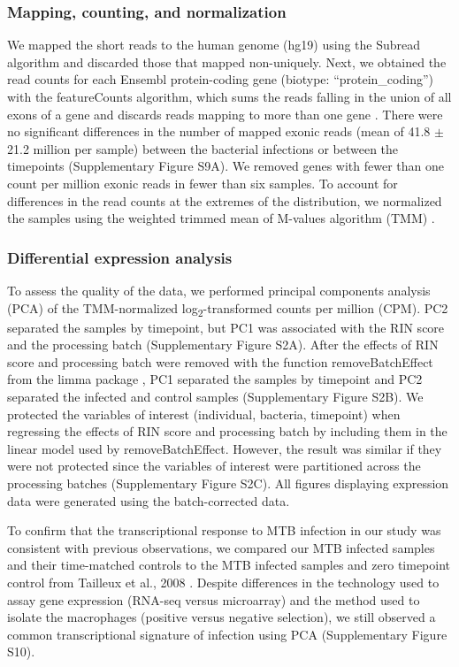 \subsubsection{Mapping, counting, and
normalization}\label{mapping-counting-and-normalization}

We mapped the short reads to the human genome (hg19) using the Subread
algorithm \citep{Liao2013} and discarded those that mapped non-uniquely.
Next, we obtained the read counts for each Ensembl protein-coding gene
(biotype: ``protein\_coding'') with the featureCounts algorithm, which
sums the reads falling in the union of all exons of a gene and discards
reads mapping to more than one gene \citep{Liao2013a}. There were no
significant differences in the number of mapped exonic reads (mean of
41.8 $\pm$ 21.2 million per sample) between the bacterial infections or
between the timepoints (Supplementary Figure S9A). We removed genes with
fewer than one count per million exonic reads in fewer than six samples.
To account for differences in the read counts at the extremes of the
distribution, we normalized the samples using the weighted trimmed mean
of M-values algorithm (TMM) \citep{Robinson2010}.

\subsubsection{Differential expression
analysis}\label{differential-expression-analysis}

To assess the quality of the data, we performed principal components
analysis (PCA) of the TMM-normalized log\textsubscript{2}-transformed
counts per million (CPM). PC2 separated the samples by timepoint, but
PC1 was associated with the RIN score and the processing batch
(Supplementary Figure S2A). After the effects of RIN score and
processing batch were removed with the function removeBatchEffect from
the limma package \citep{Ritchie2015}, PC1 separated the samples by
timepoint and PC2 separated the infected and control samples
(Supplementary Figure S2B). We protected the variables of interest
(individual, bacteria, timepoint) when regressing the effects of RIN
score and processing batch by including them in the linear model used by
removeBatchEffect. However, the result was similar if they were not
protected since the variables of interest were partitioned across the
processing batches (Supplementary Figure S2C). All figures displaying
expression data were generated using the batch-corrected data.

To confirm that the transcriptional response to MTB infection in our
study was consistent with previous observations, we compared our MTB
infected samples and their time-matched controls to the MTB infected
samples and zero timepoint control from Tailleux et al., 2008
\citep{Tailleux2008}. Despite differences in the technology used to assay
gene expression (RNA-seq versus microarray) and the method used to
isolate the macrophages (positive versus negative selection), we still
observed a common transcriptional signature of infection using PCA
(Supplementary Figure S10).

